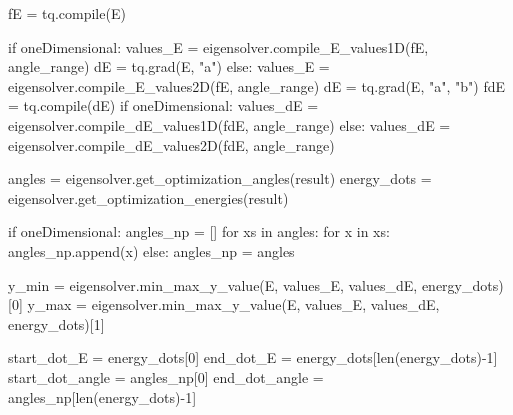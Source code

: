 \documentclass[
  letterpaper,
  DIV=11,
  numbers=noendperiod]{scrartcl}
\newenvironment{Shaded}{\begin{snugshade}}{\end{snugshade}}
\newcommand{\BuiltInTok}[1]{\textcolor[rgb]{0.00,0.23,0.31}{#1}}
\newcommand{\ControlFlowTok}[1]{\textcolor[rgb]{0.00,0.23,0.31}{#1}}
\newcommand{\DecValTok}[1]{\textcolor[rgb]{0.68,0.00,0.00}{#1}}
\newcommand{\KeywordTok}[1]{\textcolor[rgb]{0.00,0.23,0.31}{#1}}
\newcommand{\NormalTok}[1]{\textcolor[rgb]{0.00,0.23,0.31}{#1}}
\newcommand{\OperatorTok}[1]{\textcolor[rgb]{0.37,0.37,0.37}{#1}}
\newcommand{\StringTok}[1]{\textcolor[rgb]{0.13,0.47,0.30}{#1}}
\begin{document}
\begin{Shaded}
\begin{Highlighting}[]
\NormalTok{        fE }\OperatorTok{=}\NormalTok{ tq.}\BuiltInTok{compile}\NormalTok{(E)}
        
        \ControlFlowTok{if}\NormalTok{ oneDimensional:}
\NormalTok{            values\_E }\OperatorTok{=}\NormalTok{ eigensolver.compile\_E\_values1D(fE, angle\_range)}
\NormalTok{            dE }\OperatorTok{=}\NormalTok{ tq.grad(E, }\StringTok{"a"}\NormalTok{)}
        \ControlFlowTok{else}\NormalTok{:}
\NormalTok{            values\_E }\OperatorTok{=}\NormalTok{ eigensolver.compile\_E\_values2D(fE, angle\_range)}
\NormalTok{            dE }\OperatorTok{=}\NormalTok{ tq.grad(E, }\StringTok{"a"}\NormalTok{, }\StringTok{"b"}\NormalTok{)}
\NormalTok{        fdE }\OperatorTok{=}\NormalTok{ tq.}\BuiltInTok{compile}\NormalTok{(dE)}
        \ControlFlowTok{if}\NormalTok{ oneDimensional:}
\NormalTok{            values\_dE }\OperatorTok{=}\NormalTok{ eigensolver.compile\_dE\_values1D(fdE, angle\_range)}
        \ControlFlowTok{else}\NormalTok{:}
\NormalTok{            values\_dE }\OperatorTok{=}\NormalTok{ eigensolver.compile\_dE\_values2D(fdE, angle\_range)}
        
\NormalTok{        angles }\OperatorTok{=}\NormalTok{ eigensolver.get\_optimization\_angles(result)}
\NormalTok{        energy\_dots }\OperatorTok{=}\NormalTok{ eigensolver.get\_optimization\_energies(result)}
        
        \ControlFlowTok{if}\NormalTok{ oneDimensional:}
\NormalTok{            angles\_np }\OperatorTok{=}\NormalTok{ []}
            \ControlFlowTok{for}\NormalTok{ xs }\KeywordTok{in}\NormalTok{ angles:}
                \ControlFlowTok{for}\NormalTok{ x }\KeywordTok{in}\NormalTok{ xs:}
\NormalTok{                    angles\_np.append(x)}
        \ControlFlowTok{else}\NormalTok{:}
\NormalTok{            angles\_np }\OperatorTok{=}\NormalTok{ angles}

\NormalTok{        y\_min }\OperatorTok{=}\NormalTok{ eigensolver.min\_max\_y\_value(E, values\_E, values\_dE, energy\_dots)[}\DecValTok{0}\NormalTok{]}
\NormalTok{        y\_max }\OperatorTok{=}\NormalTok{ eigensolver.min\_max\_y\_value(E, values\_E, values\_dE, energy\_dots)[}\DecValTok{1}\NormalTok{]}
        
\NormalTok{        start\_dot\_E }\OperatorTok{=}\NormalTok{ energy\_dots[}\DecValTok{0}\NormalTok{]}
\NormalTok{        end\_dot\_E }\OperatorTok{=}\NormalTok{ energy\_dots[}\BuiltInTok{len}\NormalTok{(energy\_dots)}\OperatorTok{{-}}\DecValTok{1}\NormalTok{]}
\NormalTok{        start\_dot\_angle }\OperatorTok{=}\NormalTok{ angles\_np[}\DecValTok{0}\NormalTok{]}
\NormalTok{        end\_dot\_angle }\OperatorTok{=}\NormalTok{ angles\_np[}\BuiltInTok{len}\NormalTok{(energy\_dots)}\OperatorTok{{-}}\DecValTok{1}\NormalTok{]}
        

\end{Highlighting}
\end{Shaded}
\end{document}
